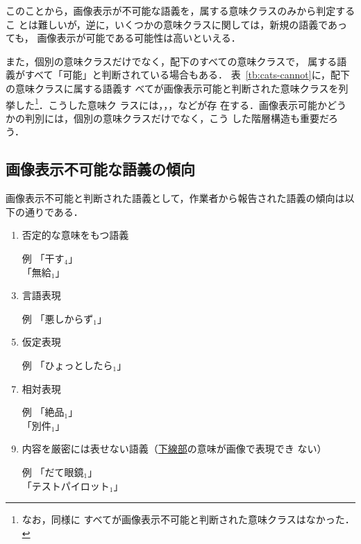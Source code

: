 \documentclass[japanese]{jnlp_1.4}
\newcommand{\izs}[1]{}
\newcommand{\gogi}[1]{}
\begin{document}
このことから，画像表示が不可能な語義を，属する意味クラスのみから判定するこ
とは難しいが，逆に，いくつかの意味クラスに関しては，新規の語義であっても，
画像表示が可能である可能性は高いといえる．

また，個別の意味クラスだけでなく，配下のすべての意味クラスで，
属する語義がすべて「可能」と判断されている場合もある．
表~\ref{tb:cats-cannot}に，配下の意味クラスに属する語義す
べてが画像表示可能と判断された意味クラスを列挙した\footnote{なお，同様に
すべてが画像表示不可能と判断された意味クラスはなかった．}．こうした意味ク
ラスには，\izs{838:食料}，\izs{671:植物}，\izs{925:目印・象徴物}などが存
在する．画像表示可能かどうかの判別には，個別の意味クラスだけでなく，こう
した階層構造も重要だろう．

\begin{table}[p]
\label{tb:cats-cannot}

\end{table}



\subsection{画像表示不可能な語義の傾向}
\label{sec:ex-cannot}

画像表示不可能と判断された語義として，作業者から報告された語義の傾向は以
下の通りである．

\begin{enumerate}
 \item 否定的な意味をもつ語義
 \item[例]
「干す$_4$」 \gogi{仕事などを与えない．}\\
「無給$_1$」 \gogi{給料が無いこと．給料を支給しないこと．}

 \item 言語表現
 \item [例]
「悪しからず$_1$」 \gogi{悪く思わないで．よろしく．相手の気持ちを考えないで物事をしたときなどに了承を得るために使う言葉．}

 \item 仮定表現
 \item[例]
「ひょっとしたら$_1$」\gogi{もしかすると．ひょっとすると．}

 \item 相対表現
 \item[例]
「絶品$_1$」 \gogi{比べるものが無いほど優れた品物や作品．}\\
「別件$_1$」 \gogi{別の用件．別の事件．}

 \item 内容を厳密には表せない語義（\ul{下線部}の意味が画像で表現でき
       ない）
 \item[例]
「だて眼鏡$_1$」 \gogi{\ul{実際には掛ける必要が無いのに}、お洒落のために掛け
	  る眼鏡．}\\
「テストパイロット$_1$」 \gogi{新しく製造された航空機の\ul{試験飛行をする}パイロット．}
\end{enumerate}
\end{document}
